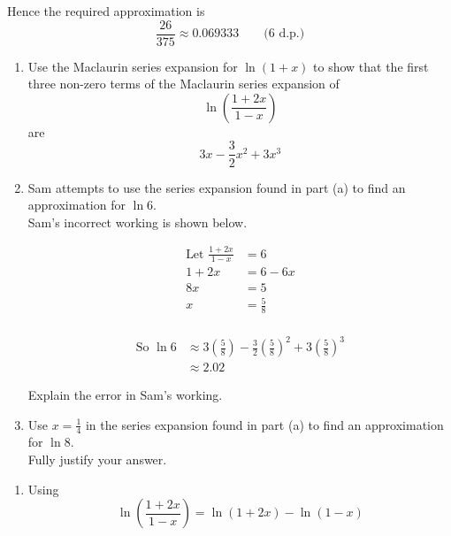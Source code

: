 \documentclass[leqno]{article}
\begin{document}
\begin{enumerate}[
  label=\textbf{\arabic*.},
  leftmargin=*,
  topsep=0pt,
  partopsep=0pt,
  parsep=0pt
]
\begin{djsSolution}
\begin{enumerate}[label=\textbf{(\alph*)}]
\begin{enumerate}[label=(\roman*)]
    Hence the required approximation is
    \[
    \frac{26}{375}\approx 0.069333\qquad\text{(6 d.p.)}
    \]
  \end{enumerate}
\end{enumerate}
\end{djsSolution}


\newpage

\questionitem

\begin{enumerate}[label=\textbf{(\alph*)}]
  \item Use the Maclaurin series expansion for $\ln(1+x)$ to show that the first three non-zero terms of the Maclaurin series expansion of
  \[
  \ln\left(\frac{1+2x}{1-x}\right)
  \]
  are
  \[
  3x-\frac{3}{2}x^2+3x^3
  \]
  \item Sam attempts to use the series expansion found in part (a) to find an approximation for $\ln 6$. \\

  Sam's incorrect working is shown below.
\begin{tcolorbox}[enhanced,boxrule=0.4pt,colback=white,arc=0mm,outer arc=0mm]
  \[
  \begin{aligned}
  \text{Let } \frac{1+2x}{1-x} &= 6\\
  1+2x &= 6-6x\\
  8x &= 5\\
  x &= \frac{5}{8} 
  \end{aligned}
  \] \\
  \[
  \begin{aligned}
  \text{So } \ln 6 &\approx 3\left(\frac{5}{8}\right)-\frac{3}{2}\left(\frac{5}{8}\right)^2+3\left(\frac{5}{8}\right)^3\\
  &\approx 2.02
  \end{aligned}
  \]
\end{tcolorbox}
  Explain the error in Sam's working.  \\
  \item Use $x=\frac{1}{4}$ in the series expansion found in part (a) to find an approximation for $\ln 8$. \\

  Fully justify your answer.  \\
\end{enumerate}

\vspace*{10pt}

\begin{djsSolution}
\begin{enumerate}[label=\textbf{(\alph*)}]
  \item Using
\[
\ln\left(\frac{1+2x}{1-x}\right)=\ln(1+2x)-\ln(1-x)
\]


\end{enumerate}
\end{djsSolution}
\end{enumerate}
\end{document}
